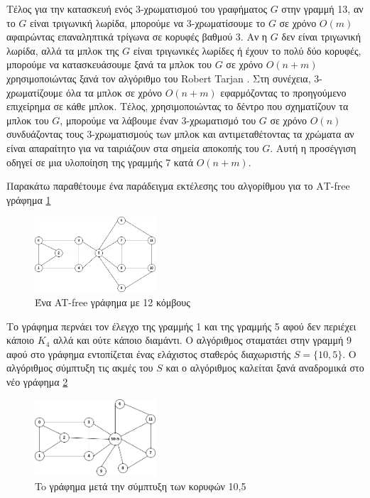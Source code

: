 Τέλος για την κατασκευή ενός 3-χρωματισμού του γραφήματος $G$ στην γραμμή 13, αν το $G$ είναι τριγωνική λωρίδα, μπορούμε να 3-χρωματίσουμε το $G$ σε χρόνο $O(m)$ αφαιρώντας επαναληπτικά τρίγωνα σε κορυφές βαθμού 3. Αν η $G$ δεν είναι τριγωνική λωρίδα, αλλά τα μπλοκ της $G$ είναι τριγωνικές λωρίδες ή έχουν το πολύ δύο κορυφές, μπορούμε να κατασκευάσουμε ξανά τα μπλοκ του $G$ σε χρόνο $O(n + m)$ χρησιμοποιώντας ξανά τον αλγόριθμο του Robert Tarjan \cite{tarjan-depth-first-search}. Στη συνέχεια, 3-χρωματίζουμε όλα τα μπλοκ σε χρόνο $O(n + m)$ εφαρμόζοντας το προηγούμενο επιχείρημα σε κάθε μπλοκ. Τέλος, χρησιμοποιώντας το δέντρο που σχηματίζουν τα μπλοκ του $G$, μπορούμε να λάβουμε έναν 3-χρωματισμό του $G$ σε χρόνο $O(n)$ συνδυάζοντας τους 3-χρωματισμούς των μπλοκ και αντιμεταθέτοντας τα χρώματα αν είναι απαραίτητο για να ταιριάζουν στα σημεία αποκοπής του $G$. Αυτή η προσέγγιση οδηγεί σε μια υλοποίηση της γραμμής 7 κατά $O(n + m)$.



Παρακάτω παραθέτουμε ένα παράδειγμα εκτέλεσης του αλγορίθμου για το ΑΤ-free γράφημα \ref{fig:ex-coloring-1}

\begin{figure}[H]
	\centering
	\includegraphics[width=0.4\textwidth]{pictures/ex-coloring-1.png} 
	\caption{Ένα AT-free γράφημα με 12 κόμβους}
	\label{fig:ex-coloring-1}
\end{figure}

Το γράφημα περνάει τον έλεγχο της γραμμής 1 και της γραμμής 5 αφού δεν περιέχει κάποιο $K_4$ αλλά και ούτε κάποιο διαμάντι. Ο αλγόριθμος σταματάει στην γραμμή 9 αφού στο γράφημα εντοπίζεται ένας ελάχιστος σταθερός διαχωριστής $S = \{ 10, 5\}$. Ο αλγόριθμος σύμπτυξη τις ακμές του $S$ και ο αλγόριθμος καλείται ξανά αναδρομικά στο νέο γράφημα \ref{fig:ex-coloring-2}

\begin{figure}[H]
	\centering
	\includegraphics[width=0.4\textwidth]{pictures/ex-coloring-2.png} 
	\caption{To γράφημα μετά την σύμπτυξη των κορυφών 10,5}
	\label{fig:ex-coloring-2}
\end{figure}


